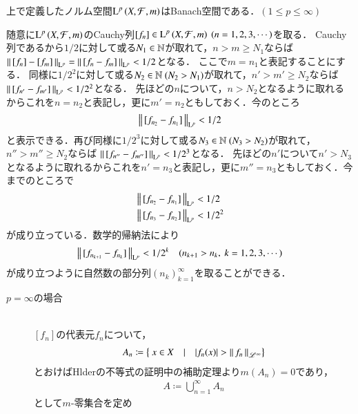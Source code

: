 \begin{qst}
\begin{prp}
	上で定義したノルム空間$\operatorname{L}^{p} \left(X,\mathcal{F},m\right)$はBanach空間である．$(1 \leq p \leq \infty)$
\end{prp}
\begin{prf}
	随意に$\operatorname{L}^{p} \left(X,\mathcal{F},m\right)$のCauchy列$[f_n] \in \Lp{p}{X,\mathcal{F},m}\ (n=1,2,3,\cdots)$を取る．
	Cauchy列であるから$1/2$に対して或る$N_1 \in \mathbb{N}$が取れて，$n>m \geq N_1$ならば
	$\left\|\, [f_n]-[f_m]\, \right\|_{\mathrm{L}^p} = \left\|\, [f_n - f_m]\, \right\|_{\mathrm{L}^p} < 1/2$となる．
	ここで$m = n_1$と表記することにする．
	同様に$1/2^2$に対して或る$N_2 \in \mathbb{N}\ (N_2 > N_1)$が取れて，$n'>m' \geq N_2$ならば
	$\left\|\, [f_{n'} - f_{m'}]\, \right\|_{\mathrm{L}^p} < 1/2^2$となる．
	先ほどの$n$について，$n > N_2$となるように取れるからこれを$n = n_2$と表記し，更に$m' = n_2$ともしておく．今のところ
	\begin{align}
		\left\|\, [f_{n_2} - f_{n_1}]\, \right\|_{\mathrm{L}^p} < 1/2
	\end{align}
	と表示できる．再び同様に$1/2^3$に対して或る$N_3 \in \mathbb{N}\ (N_3 > N_2)$が取れて，$n''>m'' \geq N_2$ならば
	$\left\|\, [f_{n''} - f_{m''}]\, \right\|_{\mathrm{L}^p} < 1/2^3$となる．
	先ほどの$n'$について$n' > N_3$となるように取れるからこれを$n' = n_3$と表記し，更に$m'' = n_3$ともしておく．今までのところで
	\begin{align}
		&\left\|\, [f_{n_2} - f_{n_1}]\, \right\|_{\mathrm{L}^p} < 1/2 \\
		&\left\|\, [f_{n_3} - f_{n_2}]\, \right\|_{\mathrm{L}^p} < 1/2^2
	\end{align}
	が成り立っている．数学的帰納法により
	\begin{align}
		\left\|\, [f_{n_{k+1}} - f_{n_k}]\, \right\|_{\mathrm{L}^p} < 1/2^k \quad (n_{k+1} > n_k,\ k=1,2,3,\cdots) \label{ineq:Lp_banach_2}
	\end{align}
	が成り立つように自然数の部分列$(n_k)_{k=1}^{\infty}$を取ることができる．
	\begin{description}
		\item[$p = \infty$の場合]\mbox{}\\
			$[f_n]$の代表元$f_n$について，
			\begin{align}
				A_n \coloneqq \left\{\ x \in X\quad |\quad |f_n(x)| > \left\|\, f_n\, \right\|_{\mathscr{L}^\infty} \right\}
			\end{align}
			とおけばHlderの不等式の証明中の補助定理より$m(A_n) = 0$であり，
			\begin{align}
				A \coloneqq \bigcup_{n=1}^{\infty} A_n
			\end{align}
			として$m$-零集合を定め
			\begin{align}

\end{align}
\end{description}
\end{prf}
\end{qst}
